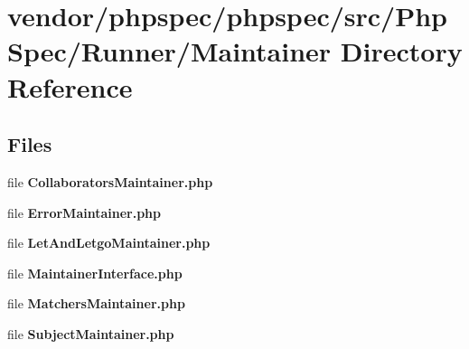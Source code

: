 \section{vendor/phpspec/phpspec/src/\+Php\+Spec/\+Runner/\+Maintainer Directory Reference}
\label{dir_73994657c94ab98701bb1cb2a36fa4c1}
\subsection*{Files}
\begin{DoxyCompactItemize}
\item 
file {\bf Collaborators\+Maintainer.\+php}
\item 
file {\bf Error\+Maintainer.\+php}
\item 
file {\bf Let\+And\+Letgo\+Maintainer.\+php}
\item 
file {\bf Maintainer\+Interface.\+php}
\item 
file {\bf Matchers\+Maintainer.\+php}
\item 
file {\bf Subject\+Maintainer.\+php}
\end{DoxyCompactItemize}
